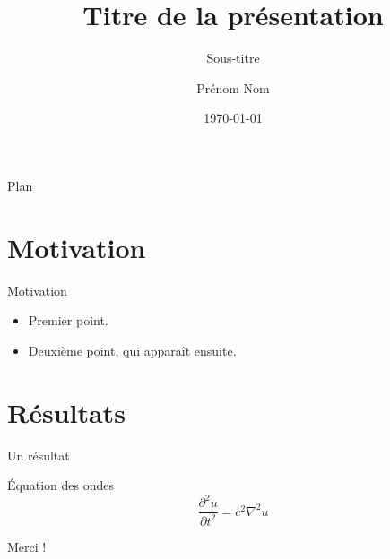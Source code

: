 \documentclass[aspectratio=169]{beamer}
\title{Titre de la présentation}
\subtitle{Sous-titre}
\author{Prénom Nom}
\institute{Institution}
\date{\today}
\begin{document}
\begin{frame}
  \titlepage
\end{frame}

\begin{frame}{Plan}
  \tableofcontents
\end{frame}

\section{Motivation}

\begin{frame}{Motivation}
  \begin{itemize}
    \item<1-> Premier point.
    \item<2-> Deuxième point, qui apparaît ensuite.
  \end{itemize}
\end{frame}

\section{Résultats}

\begin{frame}{Un résultat}
  \begin{block}{Équation des ondes}
    \[
      \frac{\partial^2 u}{\partial t^2} = c^2 \nabla^2 u
    \]
  \end{block}
\end{frame}

\begin{frame}
  \centering\Large Merci !
\end{frame}
\end{document}
